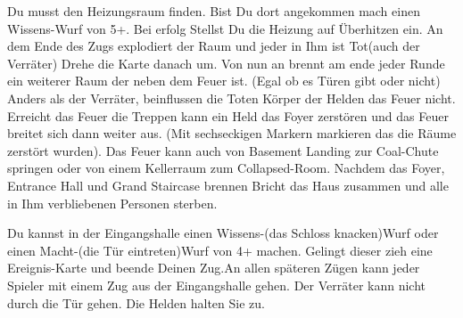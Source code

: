 





Du musst den Heizungsraum finden. Bist Du dort angekommen mach einen Wissens-Wurf von 5+.
Bei erfolg Stellst Du die Heizung auf Überhitzen ein.
An dem Ende des Zugs explodiert der Raum und jeder in Ihm ist Tot(auch der Verräter)
Drehe die Karte danach um.
Von nun an brennt am ende jeder Runde ein weiterer Raum der neben dem Feuer ist.
(Egal ob es Türen gibt oder nicht)
Anders als der Verräter, beinflussen die Toten Körper der Helden das Feuer nicht.
Erreicht das Feuer die Treppen kann ein Held das Foyer zerstören und das Feuer breitet sich dann weiter aus.
(Mit sechseckigen Markern markieren das die Räume zerstört wurden).
Das Feuer kann auch von Basement Landing zur Coal-Chute springen oder von einem Kellerraum zum Collapsed-Room.
Nachdem das Foyer, Entrance Hall und Grand Staircase brennen Bricht das Haus zusammen und alle in Ihm verbliebenen Personen sterben.

\newpage


Du kannst in der Eingangshalle einen Wissens-(das Schloss knacken)Wurf oder einen Macht-(die Tür eintreten)Wurf von 4+ machen. Gelingt dieser zieh eine Ereignis-Karte und beende Deinen Zug.An allen späteren Zügen kann jeder Spieler mit einem Zug aus der Eingangshalle gehen.
Der Verräter kann nicht durch die Tür gehen. Die Helden halten Sie zu.



